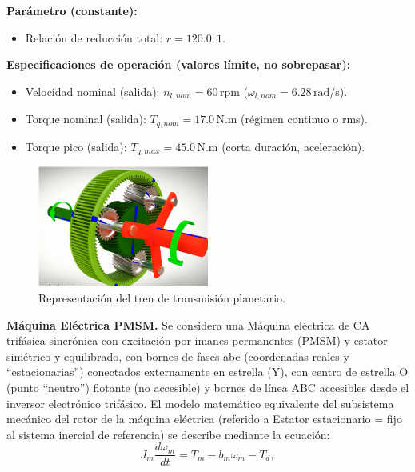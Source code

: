 \documentclass{article}
\begin{document}
\textbf{Parámetro (constante):}
\begin{itemize}
    \item Relación de reducción total: \( r = 120.0 : 1 \).
\end{itemize}

\textbf{Especificaciones de operación (valores límite, no sobrepasar):}
\begin{itemize}
    \item Velocidad nominal (salida): \( n_{l,nom} = 60 \, \text{rpm} \) (\( \omega_{l,nom} = 6.28 \, \text{rad/s} \)).
    \item Torque nominal (salida): \( T_{q,nom} = 17.0 \, \text{N.m} \) (régimen continuo o rms).
    \item Torque pico (salida): \( T_{q,max} = 45.0 \, \text{N.m} \) (corta duración, aceleración).
\end{itemize}

\begin{figure}[H]
    \centering
    \includegraphics[width=0.5\textwidth]{Imagenes/tren_transmision.png}
    \caption{Representación del tren de transmisión planetario.}
    \label{fig:tren_transmision}
\end{figure}



\textbf{Máquina Eléctrica PMSM.}
Se considera una Máquina eléctrica de CA trifásica sincrónica con excitación por imanes permanentes (PMSM) y estator simétrico y equilibrado, con bornes de fases abc (coordenadas reales y “estacionarias”) conectados externamente en estrella (Y), con centro de estrella O (punto “neutro”) flotante (no accesible) y bornes de línea ABC accesibles desde el inversor electrónico trifásico.
El modelo matemático equivalente del subsistema mecánico del rotor de la máquina eléctrica (referido a Estator estacionario = fijo al sistema inercial de referencia) se describe mediante la ecuación:
\begin{equation}
    \label{eq:subsistema_mecanico_maquina_pmsm}
    J_m \frac{d\omega_m}{dt} = T_m - b_m \omega_m - T_d,
\end{equation}
\end{document}
